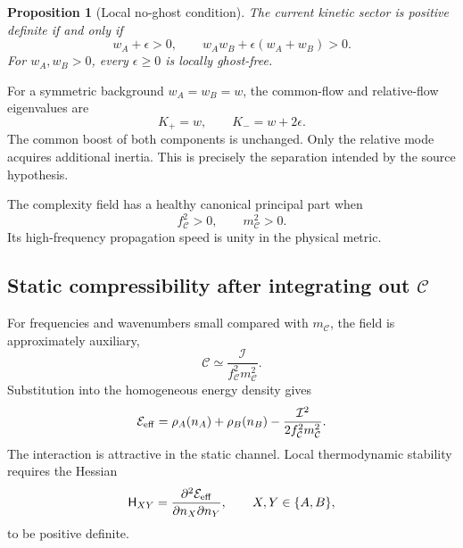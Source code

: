 \documentclass[11pt]{article}
\newtheorem{proposition}[definition]{Proposition}
\begin{document}
\begin{proposition}[Local no-ghost condition]
The current kinetic sector is positive definite if and only if
\begin{equation}
w_A+\epsilon>0,
\qquad
w_Aw_B+\epsilon(w_A+w_B)>0.
\label{eq:kineticConditions}
\end{equation}
For $w_A,w_B>0$, every $\epsilon\geq0$ is locally ghost-free.
\end{proposition}

For a symmetric background $w_A=w_B=w$, the common-flow and relative-flow eigenvalues are
\begin{equation}
K_+=w,
\qquad
K_-=w+2\epsilon.
\label{eq:kineticEigenvalues}
\end{equation}
The common boost of both components is unchanged.  Only the relative mode acquires additional inertia.  This is precisely the separation intended by the source hypothesis.

The complexity field has a healthy canonical principal part when
\begin{equation}
f_{\mathcal C}^2>0,
\qquad
m_{\mathcal C}^2>0.
\label{eq:Cstability}
\end{equation}
Its high-frequency propagation speed is unity in the physical metric.

\subsection{Static compressibility after integrating out \texorpdfstring{$\mathcal C$}{C}}

For frequencies and wavenumbers small compared with $m_{\mathcal C}$, the field is approximately auxiliary,
\begin{equation}
\mathcal C\simeq\frac{\mathcal I}{f_{\mathcal C}^2m_{\mathcal C}^2}.
\label{eq:Caux}
\end{equation}
Substitution into the homogeneous energy density gives
\begin{equation}
\mathcal E_{\rm eff}
=\rho_A(n_A)+\rho_B(n_B)
-\frac{\mathcal I^2}{2f_{\mathcal C}^2m_{\mathcal C}^2}.
\label{eq:EeffGeneral}
\end{equation}
The interaction is attractive in the static channel.  Local thermodynamic stability requires the Hessian
\begin{equation}
\mathsf H_{XY}
=\frac{\partial^2\mathcal E_{\rm eff}}
{\partial n_X\partial n_Y},
\qquad X,Y\in\{A,B\},
\label{eq:Hessian}
\end{equation}
to be positive definite.
\end{document}
